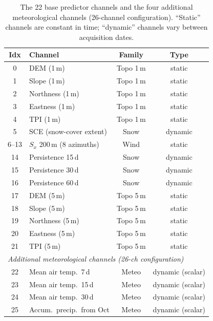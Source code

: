 \begin{table}[t]
  \centering
  \caption{The 22 base predictor channels and the four additional
  meteorological channels (26-channel configuration). ``Static'' channels are
  constant in time; ``dynamic'' channels vary between acquisition dates.}
  \label{tab:channels}
  \small
  \begin{tabular}{clcc}
    \toprule
    Idx & Channel & Family & Type \\
    \midrule
    0  & DEM (1\,m)              & Topo 1\,m   & static  \\
    1  & Slope (1\,m)            & Topo 1\,m   & static  \\
    2  & Northness (1\,m)        & Topo 1\,m   & static  \\
    3  & Eastness (1\,m)         & Topo 1\,m   & static  \\
    4  & TPI (1\,m)              & Topo 1\,m   & static  \\
    5  & SCE (snow-cover extent) & Snow        & dynamic \\
    6--13 & $S_x$ 200\,m (8 azimuths) & Wind   & static  \\
    14 & Persistence 15\,d       & Snow        & dynamic \\
    15 & Persistence 30\,d       & Snow        & dynamic \\
    16 & Persistence 60\,d       & Snow        & dynamic \\
    17 & DEM (5\,m)              & Topo 5\,m   & static  \\
    18 & Slope (5\,m)            & Topo 5\,m   & static  \\
    19 & Northness (5\,m)        & Topo 5\,m   & static  \\
    20 & Eastness (5\,m)         & Topo 5\,m   & static  \\
    21 & TPI (5\,m)              & Topo 5\,m   & static  \\
    \midrule
    \multicolumn{4}{l}{\textit{Additional meteorological channels (26-ch
    configuration)}}\\
    22 & Mean air temp.\ 7\,d    & Meteo       & dynamic (scalar) \\
    23 & Mean air temp.\ 15\,d   & Meteo       & dynamic (scalar) \\
    24 & Mean air temp.\ 30\,d   & Meteo       & dynamic (scalar) \\
    25 & Accum.\ precip.\ from Oct & Meteo     & dynamic (scalar) \\
    \bottomrule
  \end{tabular}
\end{table}

